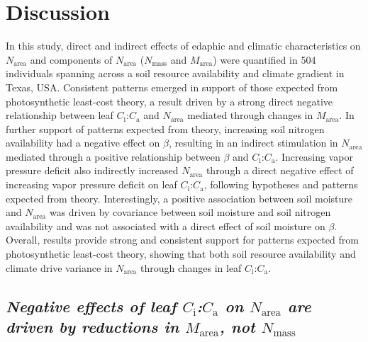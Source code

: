 \section{Discussion}
\noindent In this study, direct and indirect effects of edaphic and climatic characteristics on $N_\mathrm{area}$ and components of $N_\mathrm{area}$ ($N_\mathrm{mass}$ and $M_\mathrm{area}$) were quantified in 504 individuals spanning across a soil resource availability and climate gradient in Texas, USA. Consistent patterns emerged in support of those expected from photosynthetic least-cost theory, a result driven by a strong direct negative relationship between leaf $C_\mathrm{i}$:$C_\mathrm{a}$ and $N_\mathrm{area}$ mediated through changes in $M_\mathrm{area}$. In further support of patterns expected from theory, increasing soil nitrogen availability had a negative effect on $\beta$, resulting in an indirect stimulation in $N_\mathrm{area}$ mediated through a positive relationship between $\beta$ and $C_\mathrm{i}$:$C_\mathrm{a}$. Increasing vapor pressure deficit also indirectly increased $N_\mathrm{area}$ through a direct negative effect of increasing vapor pressure deficit on leaf $C_\mathrm{i}$:$C_\mathrm{a}$, following hypotheses and patterns expected from theory. Interestingly, a positive association between soil moisture and $N_\mathrm{area}$ was driven by covariance between soil moisture and soil nitrogen availability and was not associated with a direct effect of soil moisture on $\beta$. Overall, results provide strong and consistent support for patterns expected from photosynthetic least-cost theory, showing that both soil resource availability and climate drive variance in $N_\mathrm{area}$ through changes in leaf $C_\mathrm{i}$:$C_\mathrm{a}$.

\subsection{\textit{Negative effects of leaf $C_\mathrm{i}$:$C_\mathrm{a}$ on $N_\mathrm{area}$ are driven by reductions in $M_\mathrm{area}$, not $N_\mathrm{mass}$}}


